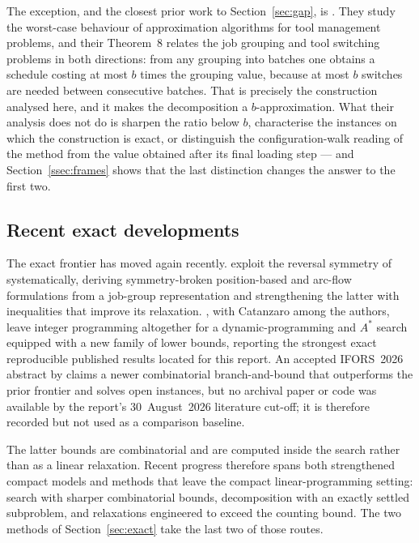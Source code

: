 The exception, and the closest prior work to Section~\ref{sec:gap}, is
\citet{CramaKlundert1999}. They study the worst-case behaviour of approximation
algorithms for tool management problems, and their Theorem~8 relates the job grouping
and tool switching problems in both directions: from any grouping into batches one
obtains a schedule costing at most $b$ times the grouping value, because at most $b$
switches are needed between consecutive batches. That is precisely the construction
analysed here, and it makes the decomposition a $b$-approximation. What their analysis
does not do is sharpen the ratio below $b$, characterise the instances on which the
construction is exact, or distinguish the configuration-walk reading of the method from
the value obtained after its final loading step --- and
Section~\ref{ssec:frames} shows that the last distinction changes the answer to the
first two.

\subsection{Recent exact developments}\label{ssec:sota-recent}

The exact frontier has moved again recently. \citet{Akhundov2024} exploit the reversal
symmetry of \citet{Ghiani2010} systematically, deriving symmetry-broken position-based
and arc-flow formulations from a job-group representation and strengthening the latter
with inequalities that improve its relaxation. \citet{Legrand2025}, with Catanzaro among the
authors, leave integer programming altogether for a dynamic-programming and $A^{*}$
search equipped with a new family of lower bounds, reporting the strongest exact
reproducible published results located for this report. An accepted IFORS~2026
abstract by \citet{Locatelli2026} claims a newer combinatorial branch-and-bound that
outperforms the prior frontier and solves open instances, but no archival paper or
code was available by the report's 30~August~2026 literature cut-off; it is therefore
recorded but not used as a comparison baseline.

The latter bounds are combinatorial and are computed inside the search rather than as
a linear relaxation. Recent progress therefore spans both strengthened compact models
and methods that leave the compact linear-programming setting: search with sharper
combinatorial bounds, decomposition with an exactly settled subproblem, and
relaxations engineered to exceed the counting bound. The two methods of
Section~\ref{sec:exact} take the last two of those routes.

